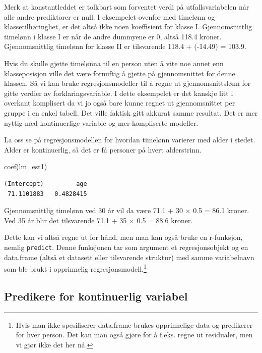 \documentclass[
  letterpaper,
  DIV=11,
  numbers=noendperiod]{scrreprt}
\newenvironment{Shaded}{\begin{snugshade}}{\end{snugshade}}
\newcommand{\FunctionTok}[1]{\textcolor[rgb]{0.28,0.35,0.67}{#1}}
\newcommand{\NormalTok}[1]{\textcolor[rgb]{0.00,0.23,0.31}{#1}}
\theoremstyle{definition}
\theoremstyle{remark}
\begin{document}
Merk at konstantleddet er tolkbart som forventet verdi på
utfallsvariabelen når alle andre prediktorer er null. I eksempelet
ovenfor med timelønn og klassetilhøringhet, er det altså ikke noen
koeffisient for klasse I. Gjennomsnittlig timelønn i klasse I er når de
andre dummyene er 0, altså 118.4 kroner. Gjennomsnittlig timelønn for
klasse II er tilsvarende 118.4 + (-14.49) = 103.9.

Hvis du skulle gjette timelønna til en person uten å vite noe annet enn
klasseposisjon ville det være fornuftig å gjette på gjennomsnittet for
denne klassen. Så vi kan bruke regresjonsmodeller til å regne ut
gjennomsnittslønn for gitte verdier av forklaringsvariable. I dette
eksempelet er det kanskje litt i overkant komplisert da vi jo også bare
kunne regnet ut gjennomsnittet per gruppe i en enkel tabell. Det ville
faktisk gitt akkurat samme resultat. Det er mer nyttig med kontinuerlige
variable og mer kompliserte modeller.

La oss se på regresjonsmodellen for hvordan timelønn varierer med alder
i stedet. Alder er kontinuerlig, så det er få personer på hvert
alderstrinn.

\begin{Shaded}
\begin{Highlighting}[]
\FunctionTok{coef}\NormalTok{(lm\_est1)}
\end{Highlighting}
\end{Shaded}

\begin{verbatim}
(Intercept)         age 
 71.1101883   0.4828415 
\end{verbatim}

Gjennomsnittlig timelønn ved 30 år vil da være 71.1 + 30 \(\times\) 0.5
= 86.1 kroner. Ved 35 år blir det tilsvarende 71.1 + 35 \(\times\) 0.5 =
88.6 kroner.

Dette kan vi altså regne ut for hånd, men man kan også bruke en
r-funksjon, nemlig \texttt{predict}. Denne funksjonen tar som argument
et regresjonsobjekt og en data.frame (altså et datasett eller
tilsvarende struktur) med samme variabelnavn som ble brukt i opprinnelig
regresjonsmodell.\footnote{Hvis man ikke spesifiserer data.frame brukes
  opprinnelige data og predikerer for hver person. Det kan man også
  gjøre for å f.eks. regne ut residualer, men vi gjør ikke det her nå.}

\hypertarget{predikere-for-kontinuerlig-variabel}{%
\subsection{Predikere for kontinuerlig
variabel}\label{predikere-for-kontinuerlig-variabel}}
\end{document}
